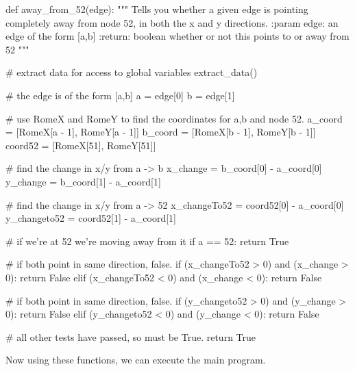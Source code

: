 \documentclass[paper=a4, fontsize=12pt]{scrartcl} %
\numberwithin{equation}{section}       %
\numberwithin{figure}{section}         %
\numberwithin{table}{section}          %
\begin{document}
\begin{python}
def away_from_52(edge):
    """
    Tells you whether a given edge is pointing completely away from
    node 52, in both the x and y directions.
    :param edge: an edge of the form [a,b]
    :return: boolean whether or not this points to or away from 52
    """

    # extract data for access to global variables
    extract_data()

    # the edge is of the form [a,b]
    a = edge[0]
    b = edge[1]

    # use RomeX and RomeY to find the coordinates for a,b and node 52.
    a_coord = [RomeX[a - 1], RomeY[a - 1]]
    b_coord = [RomeX[b - 1], RomeY[b - 1]]
    coord52 = [RomeX[51], RomeY[51]]

    # find the change in x/y from a -> b
    x_change = b_coord[0] - a_coord[0]
    y_change = b_coord[1] - a_coord[1]

    # find the change in x/y from a -> 52
    x_changeTo52 = coord52[0] - a_coord[0]
    y_changeto52 = coord52[1] - a_coord[1]

    # if we're at 52 we're moving away from it
    if a == 52:
        return True

    # if both point in same direction, false.
    if (x_changeTo52 > 0) and (x_change > 0):
        return False
    elif (x_changeTo52 < 0) and (x_change < 0):
        return False

    # if both point in same direction, false.
    if (y_changeto52 > 0) and (y_change > 0):
        return False
    elif (y_changeto52 < 0) and (y_change < 0):
        return False

    # all other tests have passed, so must be True.
    return True
\end{python}



Now using these functions, we can execute the main program.
\end{document}
